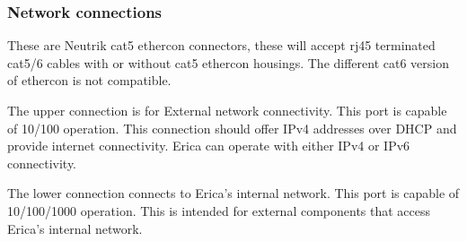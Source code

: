 \subsubsection{Network connections}

These are Neutrik cat5 ethercon connectors, these will accept rj45 terminated cat5/6 cables with or without cat5 ethercon housings. 
The different cat6 version of ethercon is not compatible.

The upper connection is for External network connectivity. 
This port is capable of 10/100 operation. This connection should offer IPv4 addresses over DHCP and provide internet connectivity. 
Erica can operate with either IPv4 or IPv6 connectivity.

The lower connection connects to Erica's internal network. 
This port is capable of 10/100/1000 operation. 
This is intended for external components that access Erica's internal network.




